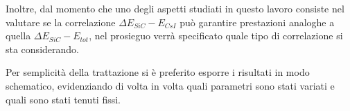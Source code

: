 Inoltre, dal momento che uno degli aspetti studiati in questo lavoro consiste nel valutare se la correlazione $\Delta E_{SiC} - E_{CsI}$ può garantire prestazioni analoghe a quella $\Delta E_{SiC} - E_{tot}$, nel prosieguo verrà specificato quale tipo di correlazione si sta considerando.

Per semplicità della trattazione si è preferito esporre i risultati in modo schematico, evidenziando di volta in volta quali parametri sono stati variati e quali sono stati tenuti fissi.

\subsection{}


